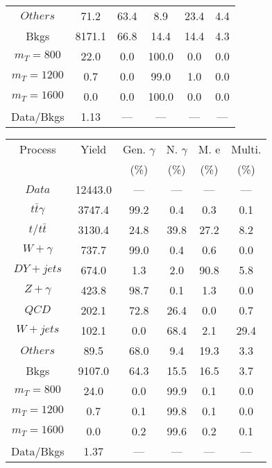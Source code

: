 \begin{figure}
\begin{minipage}[c]{0.32\textwidth}
{\begin{tabular}{cccccc}
$ Others $ &  71.2 &  63.4 &  8.9 &  23.4 &  4.4\\
Bkgs &  8171.1 &  66.8 &  14.4 &  14.4 &  4.3\\
$ m_{T} = 800 $ &  22.0 &  0.0 &  100.0 &  0.0 &  0.0\\
$ m_{T} = 1200 $ &  0.7 &  0.0 &  99.0 &  1.0 &  0.0\\
$ m_{T} = 1600 $ &  0.0 &  0.0 &  100.0 &  0.0 &  0.0\\
Data/Bkgs &  1.13 &  --- &  --- &  --- &  ---\\
\hline
\end{tabular}
}
\end{minipage}
\begin{minipage}[c]{0.32\textwidth}
\centering
\tiny{
\begin{tabular}{cccccc}
\hline
Process & Yield & Gen. $\gamma$ & N. $\gamma$ & M. e & Multi. \\
 &  & (\%) & (\%) & (\%) & (\%)  \\
\hline
                                                                      $ Data $ &  12443.0 &  --- &  --- &  --- &  ---\\
$ t\bar{t}\gamma $ &  3747.4 &  99.2 &  0.4 &  0.3 &  0.1\\
$ t/t\bar{t} $ &  3130.4 &  24.8 &  39.8 &  27.2 &  8.2\\
$ W+\gamma $ &  737.7 &  99.0 &  0.4 &  0.6 &  0.0\\
$ DY+jets $ &  674.0 &  1.3 &  2.0 &  90.8 &  5.8\\
$ Z+\gamma $ &  423.8 &  98.7 &  0.1 &  1.3 &  0.0\\
$ QCD $ &  202.1 &  72.8 &  26.4 &  0.0 &  0.7\\
$ W+jets $ &  102.1 &  0.0 &  68.4 &  2.1 &  29.4\\
$ Others $ &  89.5 &  68.0 &  9.4 &  19.3 &  3.3\\
Bkgs &  9107.0 &  64.3 &  15.5 &  16.5 &  3.7\\
$ m_{T} = 800 $ &  24.0 &  0.0 &  99.9 &  0.1 &  0.0\\
$ m_{T} = 1200 $ &  0.7 &  0.1 &  99.8 &  0.1 &  0.0\\
$ m_{T} = 1600 $ &  0.0 &  0.2 &  99.6 &  0.2 &  0.1\\
Data/Bkgs &  1.37 &  --- &  --- &  --- &  ---\\
\hline
\end{tabular}
}
\end{minipage}
\begin{minipage}[c]{0.32\textwidth}
\centering
\tiny{
}
\end{minipage}
\end{figure}
